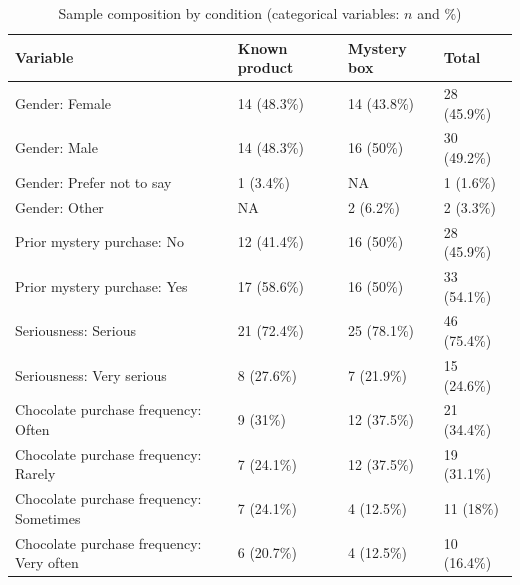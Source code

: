 \begin{table}

\caption{\label{tab:tab:summary_categorical}Sample composition by condition (categorical variables: $n$ and \%)}
\centering
\begin{tabular}[t]{llll}
\toprule
Variable & Known product & Mystery box & Total\\
\midrule
Gender: Female & 14 (48.3\%) & 14 (43.8\%) & 28 (45.9\%)\\
Gender: Male & 14 (48.3\%) & 16 (50\%) & 30 (49.2\%)\\
Gender: Prefer not to say & 1 (3.4\%) & NA & 1 (1.6\%)\\
Gender: Other & NA & 2 (6.2\%) & 2 (3.3\%)\\
Prior mystery purchase: No & 12 (41.4\%) & 16 (50\%) & 28 (45.9\%)\\
\addlinespace
Prior mystery purchase: Yes & 17 (58.6\%) & 16 (50\%) & 33 (54.1\%)\\
Seriousness: Serious & 21 (72.4\%) & 25 (78.1\%) & 46 (75.4\%)\\
Seriousness: Very serious & 8 (27.6\%) & 7 (21.9\%) & 15 (24.6\%)\\
Chocolate purchase frequency: Often & 9 (31\%) & 12 (37.5\%) & 21 (34.4\%)\\
Chocolate purchase frequency: Rarely & 7 (24.1\%) & 12 (37.5\%) & 19 (31.1\%)\\
\addlinespace
Chocolate purchase frequency: Sometimes & 7 (24.1\%) & 4 (12.5\%) & 11 (18\%)\\
Chocolate purchase frequency: Very often & 6 (20.7\%) & 4 (12.5\%) & 10 (16.4\%)\\
\bottomrule
\end{tabular}
\end{table}
